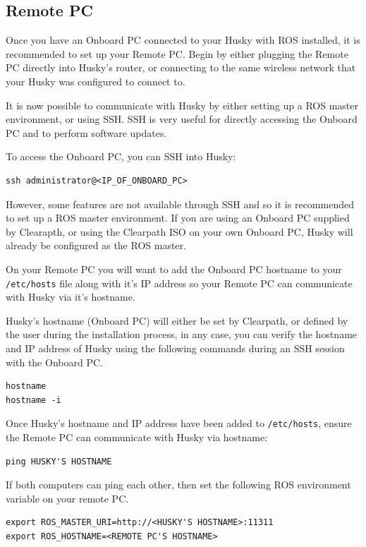 \documentclass[]{clearpath-latex/clearpath-manual}
\begin{document}
\subsection{Remote PC}

Once you have an Onboard PC connected to your Husky with ROS installed, it is recommended to set up your Remote PC.  
Begin by either plugging the Remote PC directly into Husky’s router, or connecting to the same wireless network 
that your Husky was configured to connect to.  

It is now possible to communicate with Husky by either setting up a ROS master environment, or using SSH. SSH is very useful for directly accessing the Onboard PC and to perform software updates.

To access the Onboard PC, you can SSH into Husky:

\begin{lstlisting} 
ssh administrator@<IP_OF_ONBOARD_PC>
\end{lstlisting}

However, some features are not available through SSH and so it is recommended to set up a ROS master environment. 
If you are using an Onboard PC supplied by Clearapth, or using the Clearpath ISO on your own Onboard PC, Husky will
already be configured as the ROS master.

On your Remote PC you will want to add the Onboard PC hostname to your \lstinline{/etc/hosts} file along with it's IP address 
so your Remote PC can communicate with Husky via it's hostname.

Husky's hostname (Onboard PC) will either be set by Clearpath, or defined by the user during the 
installation process, in any case, you can verify the hostname and IP address of Husky using
the following commands during an SSH session with the Onboard  PC.

\begin{lstlisting}
hostname
hostname -i
\end{lstlisting}


Once Husky's hostname and IP address have been added to \lstinline{/etc/hosts}, ensure the Remote PC
can communicate with Husky via hostname:

\begin{lstlisting}
ping HUSKY'S HOSTNAME
\end{lstlisting}

If both computers can ping each other, then set the following ROS environment variable on your remote PC.

\begin{lstlisting}
export ROS_MASTER_URI=http://<HUSKY'S HOSTNAME>:11311
export ROS_HOSTNAME=<REMOTE PC'S HOSTNAME>
\end{lstlisting}
\end{document}
